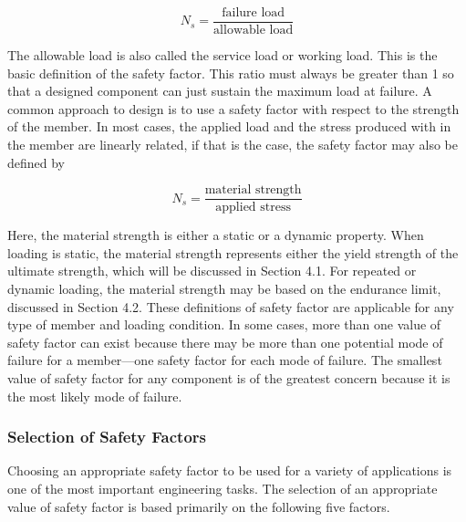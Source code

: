 \documentclass[a4paper,openany,nobib]{tufte-book}
\begin{document}
$$N_s = \frac{\text{failure load}}{\text{allowable load}}$$

The allowable load is also called the service load or working load. This
is the basic definition of the safety factor. This ratio must always be
greater than 1 so that a designed component can just sustain the maximum
load at failure. A common approach to design is to use a safety factor
with respect to the strength of the member. In most cases, the applied
load and the stress produced with in the member are linearly related, if
that is the case, the safety factor may also be defined by

$$N_s = \frac{\text{material strength}}{\text{applied stress}}$$

Here, the material strength is either a static or a dynamic property.
When loading is static, the material strength represents either the
yield strength of the ultimate strength, which will be discussed in
Section 4.1. For repeated or dynamic loading, the material strength may
be based on the endurance limit, discussed in Section 4.2. These
definitions of safety factor are applicable for any type of member and
loading condition. In some cases, more than one value of safety factor
can exist because there may be more than one potential mode of failure
for a member---one safety factor for each mode of failure. The smallest
value of safety factor for any component is of the greatest concern
because it is the most likely mode of failure.

\subsubsection{Selection of Safety Factors}
\label{selection-of-safety-factors}
Choosing an appropriate safety factor to be used for a variety of
applications is one of the most important engineering tasks. The
selection of an appropriate value of safety factor is based primarily on
the following five factors.
\end{document}
